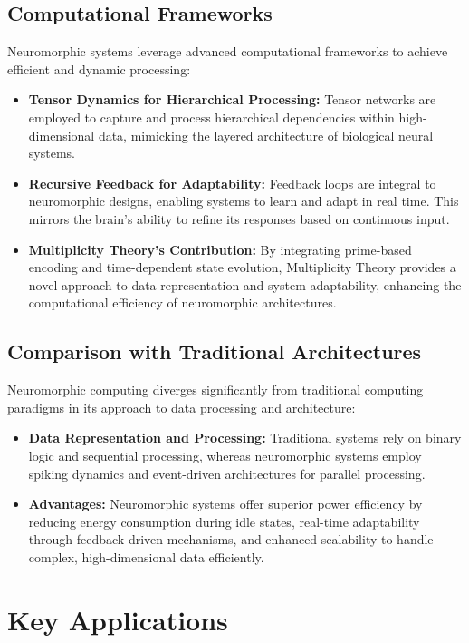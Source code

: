 \documentclass{article}
\theoremstyle{plain}
\begin{document}
\subsection{Computational Frameworks}
Neuromorphic systems leverage advanced computational frameworks to achieve efficient and dynamic processing:
\begin{itemize}
    \item \textbf{Tensor Dynamics for Hierarchical Processing:} Tensor networks are employed to capture and process hierarchical dependencies within high-dimensional data, mimicking the layered architecture of biological neural systems.
    \item \textbf{Recursive Feedback for Adaptability:} Feedback loops are integral to neuromorphic designs, enabling systems to learn and adapt in real time. This mirrors the brain's ability to refine its responses based on continuous input.
    \item \textbf{Multiplicity Theory’s Contribution:} By integrating prime-based encoding and time-dependent state evolution, Multiplicity Theory provides a novel approach to data representation and system adaptability, enhancing the computational efficiency of neuromorphic architectures.
\end{itemize}

\subsection{Comparison with Traditional Architectures}
Neuromorphic computing diverges significantly from traditional computing paradigms in its approach to data processing and architecture:
\begin{itemize}
    \item \textbf{Data Representation and Processing:} Traditional systems rely on binary logic and sequential processing, whereas neuromorphic systems employ spiking dynamics and event-driven architectures for parallel processing.
    \item \textbf{Advantages:} Neuromorphic systems offer superior power efficiency by reducing energy consumption during idle states, real-time adaptability through feedback-driven mechanisms, and enhanced scalability to handle complex, high-dimensional data efficiently.
\end{itemize}


\section{Key Applications}
\end{document}
